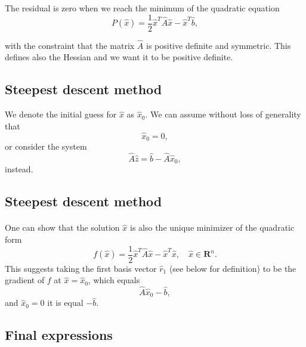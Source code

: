 \documentclass[%
oneside,                 %
final,                   %
10pt]{article}
\begin{document}
The residual is zero when we reach the minimum of the quadratic equation
\begin{equation*}
  P(\hat{x})=\frac{1}{2}\hat{x}^T\hat{A}\hat{x} - \hat{x}^T\hat{b},
\end{equation*}

with the constraint that the matrix $\hat{A}$ is positive definite and
symmetric.  This defines also the Hessian and we want it to be  positive definite.  

\subsection*{Steepest descent  method}

We denote the initial guess for $\hat{x}$ as $\hat{x}_0$. 
We can assume without loss of generality that
\begin{equation*}
\hat{x}_0=0,
\end{equation*}
or consider the system
\begin{equation*}
\hat{A}\hat{z} = \hat{b}-\hat{A}\hat{x}_0,
\end{equation*}
instead.

\subsection*{Steepest descent  method}

\paragraph{}
One can show that the solution $\hat{x}$ is also the unique minimizer of the quadratic form
\begin{equation*}
  f(\hat{x}) = \frac{1}{2}\hat{x}^T\hat{A}\hat{x} - \hat{x}^T \hat{x} , \quad \hat{x}\in\mathbf{R}^n. 
\end{equation*}
This suggests taking the first basis vector $\hat{r}_1$ (see below for definition) 
to be the gradient of $f$ at $\hat{x}=\hat{x}_0$, 
which equals
\begin{equation*}
\hat{A}\hat{x}_0-\hat{b},
\end{equation*}
and 
$\hat{x}_0=0$ it is equal $-\hat{b}$.



\subsection*{Final expressions}
\end{document}
